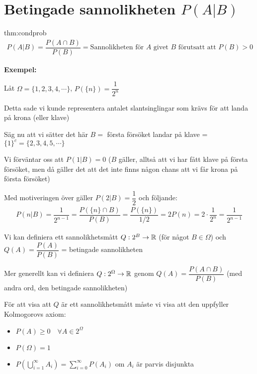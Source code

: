 \section{Betingade sannolikheten $P(A|B)$}
\par\bigskip
\begin{theo}{thm:condprob}
  \begin{equation*}
    \begin{gathered}
      P(A|B) = \dfrac{P(A\cap B)}{P(B)} = \text{Sannolikheten för $A$ givet $B$ förutsatt att $P(B)>0$}
    \end{gathered}
  \end{equation*}
\end{theo}
\par\bigskip
\noindent\textbf{Exempel:}
\par\bigskip
\noindent Låt $\Omega = \{1,2,3,4,\cdots\}$, $P(\{n\})=\dfrac{1}{2^n}$
\par\bigskip
\noindent Detta sade vi kunde representera antalet slantsinglingar som krävs för att landa på krona (eller klave)\par
\noindent Säg nu att vi sätter det här $B = $ första försöket landar på klave = $\{1\}^c = \{2,3,4,5,\cdots\}$
\par\bigskip
\noindent Vi förväntar oss att $P(1|B) = 0$ ($B$ gäller, alltså att vi har fått klave på första försöket, men då gäller det att det inte finns någon chans att vi får krona på första försöket)
\par\bigskip
\noindent Med motiveringen över gäller $P(2|B) = \dfrac{1}{2}$ och följande:
\begin{equation*}
  \begin{gathered}
    P(n|B) = \dfrac{1}{2^{n-1}} =\dfrac{P(\{n\}\cap B)}{P(B)} = \dfrac{P(\{n\})}{1/2} = 2P(n)=2\cdot\dfrac{1}{2^n} = \dfrac{1}{2^{n-1}}
  \end{gathered}
\end{equation*}
\par\bigskip
\noindent Vi kan definiera ett sannolikhetsmått $Q:2^B\to\mathbb{R}$ (för något $B\in\Omega$) och $Q(A) = \dfrac{P(A)}{P(B)}$ = betingade sannolikheten\par
\noindent Mer generellt kan vi definiera $Q:2^\Omega\to\mathbb{R}$ genom $Q(A) = \dfrac{P(A\cap B)}{P(B)}$ (med andra ord, den betingade sannolikheten)
\par\bigskip
\noindent För att visa att $Q$ är ett sannolikhetsmått måste vi visa att den uppfyller Kolmogorovs axiom:
\begin{itemize}
  \item $P(A)\geq0\quad \forall A\in2^{\Omega}$
  \item $P(\Omega) = 1$
  \item $P\left(\bigcup_{i=1}^{\infty}A_i\right) = \sum_{i=0}^{\infty}P(A_i)$ om $A_i$ är parvis disjunkta
\end{itemize}
